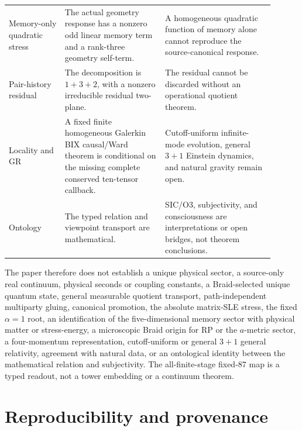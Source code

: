 \documentclass[11pt]{article}
\theoremstyle{definition}
\theoremstyle{remark}
\begin{document}
\begin{longtable}{>{\raggedright\arraybackslash}p{0.19\linewidth}>{\raggedright\arraybackslash}p{0.34\linewidth}>{\raggedright\arraybackslash}p{0.37\linewidth}}
Memory-only quadratic stress & The actual geometry response has a nonzero odd linear memory term and a rank-three geometry self-term. & A homogeneous quadratic function of memory alone cannot reproduce the source-canonical response.\\
Pair-history residual & The decomposition is $1+3+2$, with a nonzero irreducible residual two-plane. & The residual cannot be discarded without an operational quotient theorem.\\
Locality and GR & A fixed finite homogeneous Galerkin BIX causal/Ward theorem is conditional on the missing complete conserved ten-tensor callback. & Cutoff-uniform infinite-mode evolution, general $3+1$ Einstein dynamics, and natural gravity remain open.\\
Ontology & The typed relation and viewpoint transport are mathematical. & SIC/O3, subjectivity, and consciousness are interpretations or open bridges, not theorem conclusions.\\
\bottomrule
\end{longtable}

The paper therefore does not establish a unique physical sector, a source-only real continuum, physical seconds or coupling constants, a Braid-selected unique quantum state, general measurable quotient transport, path-independent multiparty gluing, canonical promotion, the absolute matrix-SLE stress, the fixed $\alpha=1$ root, an identification of the five-dimensional memory sector with physical matter or stress-energy, a microscopic Braid origin for RP or the $a$-metric sector, a four-momentum representation, cutoff-uniform or general $3+1$ general relativity, agreement with natural data, or an ontological identity between the mathematical relation and subjectivity. The all-finite-stage fixed-$87$ map is a typed readout, not a tower embedding or a continuum theorem.

\section{Reproducibility and provenance}
\end{document}
